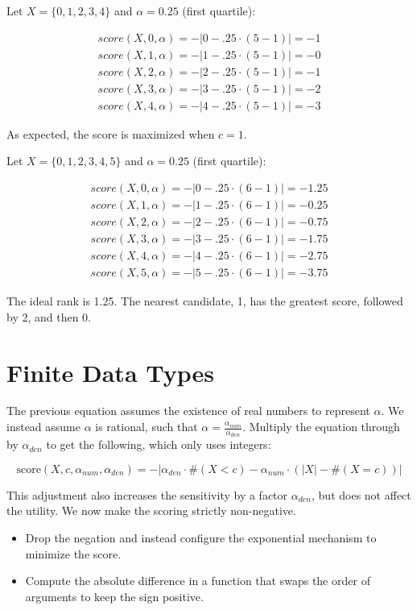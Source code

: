 \documentclass{article}
\begin{document}
Let $X = \{0,1,2,3,4\}$ and $\alpha = 0.25$ (first quartile):

\begin{align*}
    score(X, 0, \alpha) = -|0 - .25 \cdot (5 - 1)| = -1 \\
    score(X, 1, \alpha) = -|1 - .25 \cdot (5 - 1)| = -0 \\
    score(X, 2, \alpha) = -|2 - .25 \cdot (5 - 1)| = -1 \\
    score(X, 3, \alpha) = -|3 - .25 \cdot (5 - 1)| = -2 \\
    score(X, 4, \alpha) = -|4 - .25 \cdot (5 - 1)| = -3
\end{align*}

As expected, the score is maximized when $c = 1$.

Let $X = \{0,1,2,3,4,5\}$ and $\alpha = 0.25$ (first quartile):

\begin{align*}
    score(X, 0, \alpha) = -|0 - .25 \cdot (6 - 1)| = -1.25 \\
    score(X, 1, \alpha) = -|1 - .25 \cdot (6 - 1)| = -0.25 \\
    score(X, 2, \alpha) = -|2 - .25 \cdot (6 - 1)| = -0.75 \\
    score(X, 3, \alpha) = -|3 - .25 \cdot (6 - 1)| = -1.75 \\
    score(X, 4, \alpha) = -|4 - .25 \cdot (6 - 1)| = -2.75 \\
    score(X, 5, \alpha) = -|5 - .25 \cdot (6 - 1)| = -3.75
\end{align*}

The ideal rank is 1.25. The nearest candidate, 1, has the greatest score, followed by 2, and then 0. 


\section{Finite Data Types}
The previous equation assumes the existence of real numbers to represent $\alpha$.
We instead assume $\alpha$ is rational, such that $\alpha = \frac{\alpha_{num}}{\alpha_{den}}$.
Multiply the equation through by $\alpha_{den}$ to get the following, 
which only uses integers:

\begin{equation}
    \textrm{score}(X, c, \alpha_{num}, \alpha_{den}) = -|\alpha_{den} \cdot \#(X < c) - \alpha_{num} \cdot (|X| - \#(X = c))|
\end{equation}

This adjustment also increases the sensitivity by a factor $\alpha_{den}$, 
but does not affect the utility.
We now make the scoring strictly non-negative.
\begin{itemize}
    \item Drop the negation and instead configure the exponential mechanism to minimize the score.
    \item Compute the absolute difference in a function that swaps the order of arguments to keep the sign positive.
\end{itemize}
\end{document}
